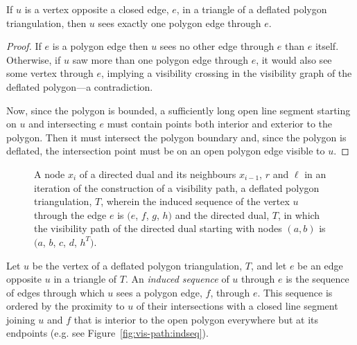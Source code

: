 \documentclass[11pt]{amsart}
\begin{document}
\begin{lemma}
  \label{lem:defl-vis-thr-uniq}
  If $u$ is a vertex opposite a closed edge, $e$, in a triangle of a
  deflated polygon triangulation, then $u$ sees exactly one polygon
  edge through $e$.
\end{lemma}
\begin{proof}
  If $e$ is a polygon edge then $u$ sees no other edge through $e$
  than $e$ itself.  Otherwise, if $u$ saw more than one polygon edge
  through $e$, it would also see some vertex through $e$, implying a
  visibility crossing in the visibility graph of the deflated
  polygon---a contradiction.
  
  Now, since the polygon is bounded, a sufficiently long open line
  segment starting on $u$ and intersecting $e$ must contain points
  both interior and exterior to the polygon.  Then it must intersect
  the polygon boundary and, since the polygon is deflated, the
  intersection point must be on an open polygon edge visible to $u$.
\end{proof}

\begin{figure}[htb]
  \centering
   \quad
   \quad
  \caption{\protect{} A node $x_i$ of a
    directed dual and its neighbours $x_{i-1}$, $r$ and $\ell$ in an
    iteration of the construction of a visibility
    path, \protect{} a deflated polygon
    triangulation, $T$, wherein the induced sequence of the vertex $u$
    through the edge $e$ is $(e$, $f$, $g$, $h)$
    and \protect{} the directed dual, $T$, in
    which the visibility path of the directed dual starting with nodes
    $(a,b)$ is $(a$, $b$, $c$, $d$, $h^T)$.}
  \label{fig:vis-path}
\end{figure}

Let $u$ be the vertex of a deflated polygon triangulation, $T$, and
let $e$ be an edge opposite $u$ in a triangle of $T$.
An \emph{induced sequence} of $u$ through $e$ is the sequence of edges
through which $u$ sees a polygon edge, $f$, through $e$.  This
sequence is ordered by the proximity to $u$ of their intersections
with a closed line segment joining $u$ and $f$ that is interior to the
open polygon everywhere but at its endpoints (e.g. see
Figure~\ref{fig:vis-path:indseq}).
\end{document}
